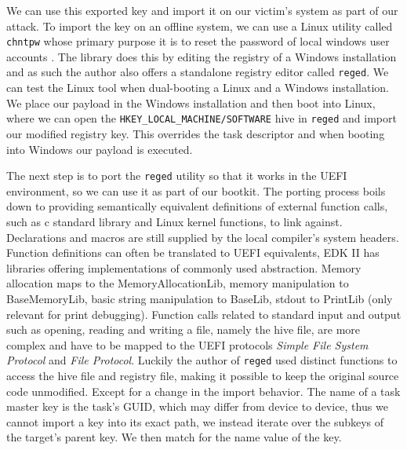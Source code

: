 We can use this exported key and import it on our victim's system as part of our attack. To import the key on an offline system, we can use a Linux utility called \lstinline{chntpw} whose primary purpose it is to reset the password of local windows user accounts \cite{chntpw}. The library does this by editing the registry of a Windows installation and as such the author also offers a standalone registry editor called \lstinline{reged}.
We can test the Linux tool when dual-booting a Linux and a Windows installation. We place our payload in the Windows installation and then boot into Linux, where we can open the \lstinline{HKEY_LOCAL_MACHINE/SOFTWARE} hive in \lstinline{reged} and import our modified registry key.
This overrides the task descriptor and when booting into Windows our payload is executed.

The next step is to port the \lstinline{reged} utility so that it works in the UEFI environment, so we can use it as part of our bootkit.
The porting process boils down to providing semantically equivalent definitions of external function calls, such as c standard library and Linux kernel functions, to link against. Declarations and macros are still supplied by the local compiler's system headers. Function definitions can often be translated to \ac{UEFI} equivalents, \ac{EDK} II has libraries offering implementations of commonly used abstraction.
Memory allocation maps to the MemoryAllocationLib, memory manipulation to BaseMemoryLib, basic string manipulation to BaseLib, stdout to PrintLib (only relevant for print debugging).
Function calls related to standard input and output such as opening, reading and writing a file, namely the hive file, are more complex and have to be mapped to the \ac{UEFI} protocols \emph{Simple File System Protocol} and \emph{File Protocol}. Luckily the author of \lstinline{reged} used distinct functions to access the hive file and registry file, making it possible to keep the original source code unmodified.
Except for a change in the import behavior. The name of a task master key is the task's \ac{GUID}, which may differ from device to device, thus we cannot import a key into its exact path, we instead iterate over the subkeys of the target's parent key. We then match for the name value of the key.

